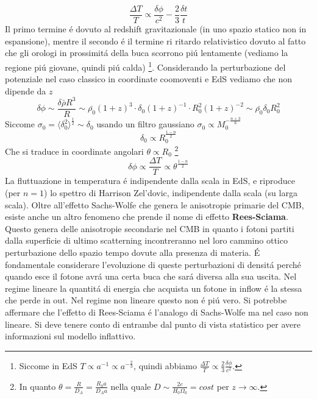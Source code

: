 \documentclass[12pt, a4paper]{article}
\begin{document}
\begin{equation}
\frac{\Delta T}{T}\propto\frac{\delta \phi}{c^2}-\frac{2}{3}\frac{\delta t}{t}
\end{equation}
Il primo termine \'{e} dovuto al redshift gravitazionale (in uno spazio statico non in espansione), mentre il secondo \'{e} il termine ri ritardo relativistico dovuto al fatto che gli orologi in prossimit\'{a} della buca scorrono pi\'{u} lentamente (vediamo la regione pi\'{u} giovane, quindi pi\'{u} calda) \footnote{Siccome in EdS $T\propto a^{-1}\propto a^{-\frac{2}{3}}$, quindi abbiamo $\frac{\Delta T}{T}\propto\frac{2}{3}\frac{\delta \phi}{c^2}$.}. Considerando la perturbazione del potenziale nel caso classico in coordinate coomoventi e EdS vediamo che non dipende da $z$
\begin{equation}
\delta \phi\sim\frac{\delta\bar{\rho} R^3}{R}\sim\bar{\rho_0}(1+z)^3 \cdot \delta_0 (1+z)^{-1}\cdot R_0^2(1+z)^{-2} \sim\bar{\rho_0} \delta_0 R_0^2
\end{equation}
Siccome $\sigma_0=\langle \delta^2_0\rangle^{\frac{1}{2}}\sim \delta_0$ usando un filtro gaussiano $\sigma_0 \propto M_0^{-\frac{n+3}{6}}$ 
\begin{equation}
\delta_0\propto R_0^{\frac{1-n}{2}}
\end{equation}
Che si traduce in coordinate angolari $\theta\propto R_0$ \footnote{In quanto $\theta=\frac{R}{D_{A}}=\frac{R_0 a}{D_{A} a}$ nella quale $D\sim \frac{2c}{H_0 \Omega_0}=cost$ per $z\rightarrow \infty$.}
\begin{equation}
\delta \phi \propto \frac{\Delta T}{T}\propto \theta^{\frac{1-n}{2}}
\end{equation}
La fluttuazione in temperatura \'{e} indipendente dalla scala in EdS, e riproduce (per $n=1$) lo spettro di Harrison Zel'dovic, indipendente dalla scala (su larga scala). Oltre all'effetto Sachs-Wolfe che genera le anisotropie primarie del CMB, esiste anche un altro fenomeno che prende il nome di effetto \textbf{Rees-Sciama}. Questo genera delle anisotropie secondarie nel CMB in quanto i fotoni partiti dalla superficie di ultimo scatterning incontreranno nel loro cammino ottico perturbazione dello spazio tempo dovute alla presenza di materia. \'{E} fondamentale considerare l'evoluzione di queste perturbazioni di densit\'{a} perch\'{e} quando esce il fotone avr\'{a} una certa buca che sar\'{a} diversa alla sua uscita. Nel regime lineare la quantit\'{a} di energia che acquista un fotone in inflow \'{e} la stessa che perde in out. Nel regime non lineare questo non \'{e} pi\'{u} vero. Si potrebbe affermare che l'effetto di Rees-Sciama \'{e} l'analogo di Sachs-Wolfe ma nel caso non lineare. Si deve tenere conto di entrambe dal punto di vista statistico per avere informazioni sul modello inflattivo.
\end{document}
